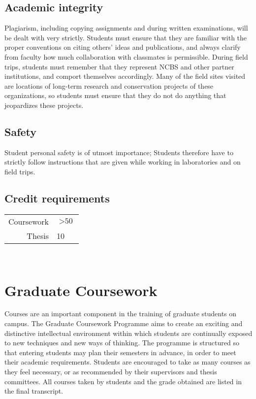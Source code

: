 \documentclass[a4paper,10pt]{article}
\begin{document}
\subsection{Academic integrity} Plagiarism, including copying assignments and
during written examinations, will be dealt with very strictly. Students must
ensure that they are familiar with the proper conventions on citing others’
ideas and publications, and always clarify from faculty how much collaboration
with classmates is permissible. During field trips, students must remember that
they represent NCBS and other partner institutions, and comport themselves
accordingly. Many of the field sites visited are locations of long-term research
and conservation projects of these organizations, so students must ensure that
they do not do anything that jeopardizes these projects.

\subsection{Safety} Student personal safety is of utmost importance; Students
therefore have to strictly follow instructions that are given while working in
laboratories and on field trips.

\subsection{Credit requirements}

\begin{tabular}{r l}
    \toprule
    Coursework & $> \text{50}$ \\
    Thesis & 10 \\
  \bottomrule
\end{tabular} \newline
 

\section{Graduate Coursework}
Courses are an important component in the training of graduate students on campus. The
Graduate Coursework Programme aims to create an exciting and distinctive intellectual
environment within which students are continually exposed to new techniques and new
ways of thinking. The programme is structured so that entering students may plan their
semesters in advance, in order to meet their academic requirements. Students are encouraged
to take as many courses as they feel necessary, or as recommended by their supervisors and
thesis committees. All courses taken by students and the grade obtained are listed in the final
transcript.
\end{document}
